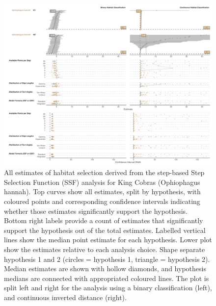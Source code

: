 \documentclass[10pt,a4paper]{article}
\begin{document}
\begin{figure}
\includegraphics[width=1\linewidth]{../../figures/specCurve_Ophiophagus hannah_ssf} \caption{All estimates of habitat selection derived from the step-based Step Selection Function (SSF) analysis for King Cobras (Ophiophagus hannah). Top curves show all estimates, split by hypothesis, with coloured points and corresponding confidence intervals indicating whether those estimates significantly support the hypothesis. Bottom right labels provide a count of estimates that significantly support the hypothesis out of the total estimates. Labelled vertical lines show the median point estimate for each hypothesis. Lower plot show the estimates relative to each analysis choice. Shape separate hypothesis 1 and 2 (circles = hypothesis 1, triangle = hypothesis 2). Median estimates are shown with hollow diamonds, and hypothesis medians are connected with appropriated coloured lines. The plot is split left and right for the analysis using a binary classification (left), and continuous inverted distance (right).}\label{fig:specCurveSsfOPHA}
\end{figure}
\end{document}
